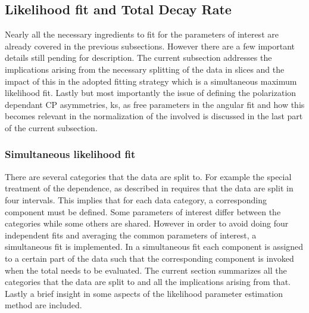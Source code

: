 \subsection{Likelihood fit and Total Decay Rate}
\label{Total_Decay_Rate}

Nearly all the necessary ingredients to fit for the parameters of interest are already covered in the previous subsections.
However there are a few important details still pending for description. The current subsection addresses the
implications arising from the necessary splitting of the data in slices and the impact of this in the adopted
fitting strategy which is a simultaneous maximum likelihood fit. Lastly but most importantly the issue of defining
the polarization dependant CP asymmetries, \Acp{k}, as free parameters in the angular fit and how this becomes
relevant in the normalization of the \pdfs involved is discussed in the last part of the current subsection.

\subsubsection{Simultaneous likelihood fit}
\label{Simutaneous_Likelihood_fit}
There are several categories that the data are split to.
For example the special treatment of the \mkpi dependence, as described in  requires that the data are
split in four \mkpi intervals. This implies that for each data category, a corresponding component \pdf must be defined.
Some parameters of interest differ between the categories while some others are shared.
However in order to avoid doing four independent fits and averaging the common parameters of interest,
a simultaneous fit is implemented. In a simultaneous fit each component \pdf is assigned to a certain part of the data
such that the corresponding component \pdf is invoked when the total \pdf needs to be evaluated. The current section summarizes
all the categories that the data are split to and all the implications arising from that. Lastly a brief insight in some aspects
of the likelihood parameter estimation method are included.

